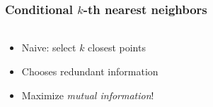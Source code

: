 \documentclass{beamer}                             %
\begin{document}
\begin{frame}
\frametitle{Conditional \( k \)-th nearest neighbors}
\framesubtitle{}

\begin{columns}
  \begin{column}{0.6\textwidth}
    \begin{itemize}
      \item<1-> Naive: select \( k \) closest points

      \item<2-> Chooses redundant information

      \item<3-> Maximize \emph{mutual information}!
    \end{itemize}
  \end{column}
  \begin{column}{0.4\textwidth}



\end{column}
\end{columns}
\end{frame}
\end{document}
